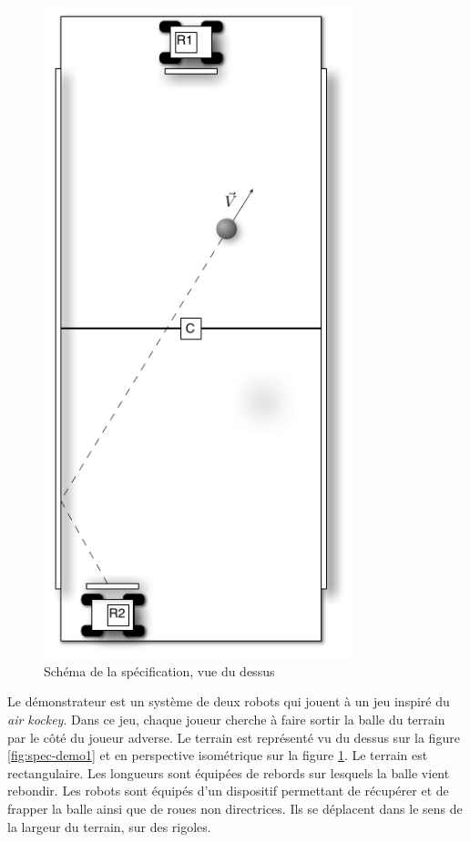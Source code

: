       \begin{figure}
        \centering
        \includegraphics[angle=270, width=0.8\textwidth]{./img/spec-demo2.pdf}
        \caption{Schéma de la spécification, vue du dessus}
        \label{fig:spec-demo2}
      \end{figure}

      Le démonstrateur est un système de deux robots qui jouent à un jeu inspiré
      du {\it air kockey}. Dans ce jeu, chaque joueur cherche à faire sortir la
      balle du terrain par le côté du joueur adverse. Le terrain est représenté
      vu du dessus sur la figure \ref{fig:spec-demo1} et en perspective
      isométrique sur la figure \ref{fig:spec-demo2}. Le terrain est
      rectangulaire. Les longueurs sont équipées de rebords sur lesquels la
      balle vient rebondir. Les robots sont équipés d'un dispositif permettant
      de récupérer et de frapper la balle ainsi que de roues non
      directrices. Ils se déplacent dans le sens de la largeur du terrain, sur
      des rigoles.

